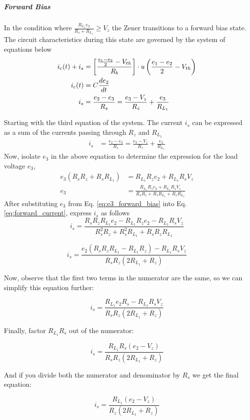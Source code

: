 \subparagraph{Forward Bias} In the condition where $\frac{R_{L_1}e_2}{R_s+R_{L_1}} \geq V_z$ the Zener transitions to a forward bias state. The circuit characteristics during this state are governed by the system of equations below
\begin{align}
    i_c(t) + i_s &= \left[\frac{\frac{e_1 - e_2}{2} - V_{th}}{R_b} \right]\cdot u\left(\frac{e_1 - e_2}{2} - V_{th} \right)\\
    i_c(t) &= C\frac{de_2}{dt}\\
    i_s &= \frac{e_2-e_3}{R_s} = \frac{e_3 - V_z}{R_z} + \frac{e_3}{R_{L_1}}
    \label{eq:system_zener}
\end{align}

Starting with the third equation of the system. The current $i_s$ can be expressed as a sum of the currents passing through $R_z$ and $R_{L_1}$
\begin{align}
i_s &= \frac{e_2-e_3}{R_s} = \frac{e_3 - V_z}{R_z} + \frac{e_3}{R_{L_1}}
\label{eq:forward_current}
\end{align}
Now, isolate $e_3$ in the above equation to determine the expression for the load voltage $e_3$,
\begin{align}
e_3(R_sR_z+R_sR_{L_1}) &= R_{L_1}R_ze_2 + R_{L_1}R_sV_z\\
e_3 &= \frac{R_{L_1}R_ze_2+R_{L_1}R_sV_z}{R_sR_z+R_sR_{L_1}+R_zR_{L_1}}
\label{eq:e3_forward_bias}
\end{align}
After substituting $e_3$ from Eq. \ref{eq:e3_forward_bias} into Eq. \ref{eq:forward_current}, express $i_s$ as follows
\begin{equation}
    i_s = \frac{R_sR_zR_{L_1}e_2 - R_{L_1}R_ze_2 - R_{L_1}R_sV_z}{R_s^2R_z+R_s^2R_{L_1}+R_sR_zR_{L_1}}
    \label{eq:is_forward_simplified}
\end{equation}

\begin{equation}
i_s = \frac{e_2(R_sR_zR_{L_1} - R_{L_1}R_z) - R_{L_1}R_sV_z}{R_sR_z(2R_{L_1} + R_z)}
\end{equation}

Now, observe that the first two terms in the numerator are the same, so we can simplify this equation further:

\begin{equation}
i_s = \frac{R_{L_1}e_2R_s - R_{L_1}R_sV_z}{R_sR_z(2R_{L_1} + R_z)}
\end{equation}

Finally, factor $R_{L_1}R_s$ out of the numerator:

\begin{equation}
i_s = \frac{R_{L_1}R_s(e_2 - V_z)}{R_sR_z(2R_{L_1} + R_z)}
\end{equation}

And if you divide both the numerator and denominator by $R_s$ we get the final equation:

\begin{equation}
i_s = \frac{R_{L_1}(e_2 - V_z)}{R_z(2R_{L_1} + R_z)}
\end{equation}